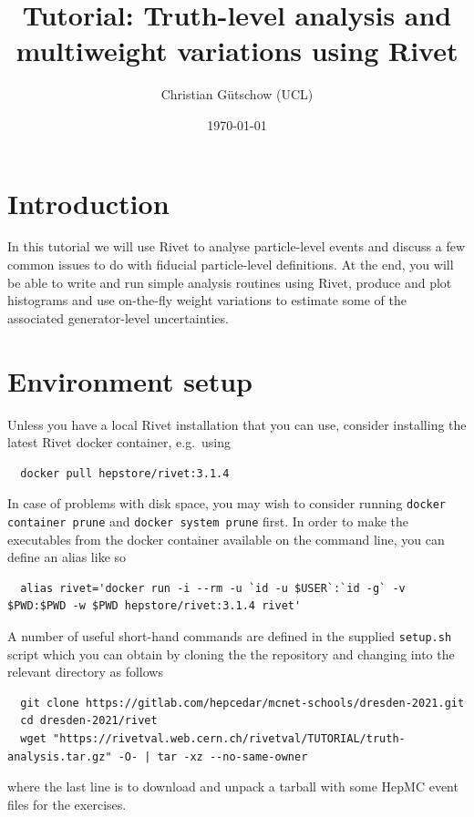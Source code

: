 \documentclass[10pt,fleqn]{scrartcl}
\theoremstyle{exstyle}
\begin{document}
\title{\vspace*{-2em} Tutorial: Truth-level analysis and multiweight variations using Rivet}
\author{Christian G\"{u}tschow (UCL)}
\date{\monthyeardate\today}
\maketitle

\section{Introduction}

In this tutorial we will use Rivet to analyse particle-level events 
and discuss a few common issues to do with fiducial particle-level definitions.
At the end, you will be able to write and run simple analysis routines using
Rivet, produce and plot histograms and use on-the-fly weight variations to
estimate some of the associated generator-level uncertainties.

\section{Environment setup}

Unless you have a local Rivet installation that you can use, consider installing the latest Rivet docker container, e.g.\ using
\begin{verbatim}
  docker pull hepstore/rivet:3.1.4
\end{verbatim}
In case of problems with disk space, you may wish to consider running
{\texttt{docker container prune}} and {\texttt{docker system prune}} first.
In order to make the executables from the docker container available on
the command line, you can define an alias like so
\begin{footnotesize}
\begin{verbatim}
  alias rivet='docker run -i --rm -u `id -u $USER`:`id -g` -v $PWD:$PWD -w $PWD hepstore/rivet:3.1.4 rivet'
\end{verbatim}
\end{footnotesize}
\noindent A number of useful short-hand commands are defined in the supplied \texttt{setup.sh} script
which you can obtain by cloning the the repository and changing into the relevant directory as follows
\begin{footnotesize}
\begin{verbatim}
  git clone https://gitlab.com/hepcedar/mcnet-schools/dresden-2021.git
  cd dresden-2021/rivet
  wget "https://rivetval.web.cern.ch/rivetval/TUTORIAL/truth-analysis.tar.gz" -O- | tar -xz --no-same-owner
\end{verbatim}
\end{footnotesize}
where the last line is to download and unpack a tarball with some HepMC event files for the exercises.
\end{document}
